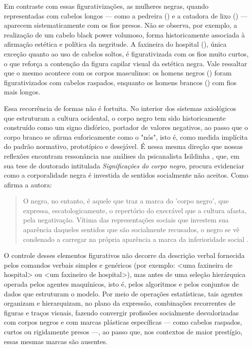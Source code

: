 \documentclass[portuguese]{textolivre}
\begin{document}
Em contraste com essas figurativizações, as mulheres negras, quando representadas com cabelos longos — como a pedreira () e a catadora de lixo () — aparecem sistematicamente com os fios presos. Não se observa, por exemplo, a realização de um cabelo black power volumoso, forma historicamente associada à afirmação estética e política da negritude. A faxineira do hospital (), única exceção quanto ao uso de cabelos soltos, é figurativizada com os fios muito curtos, o que reforça a contenção da figura capilar visual da estética negra. Vale ressaltar que o mesmo acontece com os corpos masculinos: os homens negros () foram figurativizados com cabelos raspados, enquanto os homens brancos () com fios mais longos.

Essa recorrência de formas não é fortuita. No interior dos sistemas axiológicos que estruturam a cultura ocidental, o corpo negro tem sido historicamente construído como um signo disfórico, portador de valores negativos, ao passo que o corpo branco se afirma euforicamente como o "nós", isto é, como medida implícita do padrão normativo, prototípico e desejável. É nessa mesma direção que nossas reflexões encontram ressonância nas análises da psicanalista Isildinha \textcite{nogueira1998significacoes}, que, em sua tese de doutorado intitulada \textit{Significações do corpo negro}, procura evidenciar como a corporalidade negra é investida de sentidos socialmente não aceitos. Como afirma a autora:

\begin{quote}
     O negro, no entanto, é aquele que traz a marca do 'corpo negro', que expressa, escatologicamente, o repertório do execrável que a cultura afasta, pela negativação. Vítima das representações sociais que investem sua aparência daqueles sentidos que são socialmente recusados, o negro se vê condenado a carregar na própria aparência a marca da inferioridade social \cite[p.~44]{nogueira1998significacoes}.
\end{quote}

O controle desses elementos figurativos não decorre da descrição verbal fornecida pelos comandos verbais simples e genéricos (por exemplo: <uma faxineira de hospital> ou <um faxineiro de hospital>), mas antes de uma seleção hierárquica operada pelos agentes maquínicos, isto é, pelos algoritmos e pelos conjuntos de dados que estruturam o modelo. Por meio de operações estatísticas, tais agentes organizam e hierarquizam, no plano da expressão, combinações recorrentes de figuras e traços visuais, fazendo convergir profissões socialmente desvalorizadas com corpos negros e com marcas plásticas específicas — como cabelos raspados, curtos ou rigidamente presos —, ao passo que, nos contextos de maior prestígio, essas mesmas marcas são ausentes.
\end{document}
